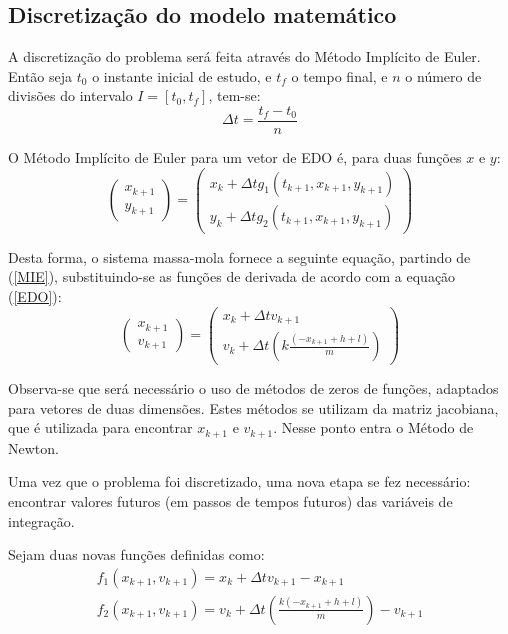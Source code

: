 \documentclass[12pt,fleqn]{article}
\begin{document}
\subsection{Discretização do modelo matemático}
A discretização do problema será feita através do Método Implícito de Euler. Então seja $t_0$ o instante inicial de estudo, e $t_f$
o tempo final, e $n$ o número de divisões do intervalo $I=[t_0,t_f]$, tem-se:
\begin{equation}
\Delta t=\frac{t_f-t_0}{n}
\end{equation}
\par
O Método Implícito de Euler para um vetor de EDO é, para duas funções $x$ e $y$:
\begin{equation}
\label{MIE}
\left(\begin{array}{c}
x_{k+1}\\
y_{k+1} \end{array}\right) = \left( \begin{array}{c}
x_k+\Delta t g_{1}(t_{k+1},x_{k+1},y_{k+1})\\
y_k+\Delta t g_{2}(t_{k+1},x_{k+1},y_{k+1})
\end{array}\right)
\end{equation}
\par
Desta  forma, o sistema massa-mola fornece a seguinte equação, partindo de (\ref{MIE}), substituindo-se as funções de derivada de acordo com a equação (\ref{EDO}):
\begin{equation}
\left(\begin{array}{c}
x_{k+1}\\
v_{k+1} \end{array}\right) = \left( \begin{array}{c}
x_k+\Delta tv_{k+1}\\
v_k+\Delta t(k\frac{(-x_{k+1}+h+l)}{m})
\end{array}\right)
\end{equation}
\par
Observa-se que será necessário o uso de métodos de zeros de funções, adaptados para vetores de duas dimensões. Estes métodos se utilizam da matriz jacobiana, que é utilizada para encontrar $x_{k+1}$ e $v_{k+1}$. Nesse ponto entra o Método de Newton.
\par
Uma vez que o problema foi discretizado, uma nova etapa se fez necessário: encontrar valores futuros (em passos de tempos futuros) das variáveis de integração. 
\par
Sejam duas novas funções definidas como:
\begin{equation}
\begin{split}
f_{1}(x_{k+1},v_{k+1})=x_{k}+\Delta t v_{k+1}-x_{k+1} \\
f_{2}(x_{k+1},v_{k+1})=v_{k}+\Delta t(\frac{k(-x_{k+1}+h+l)}{m})-v_{k+1} 
\end{split}
\end{equation}
\end{document}
